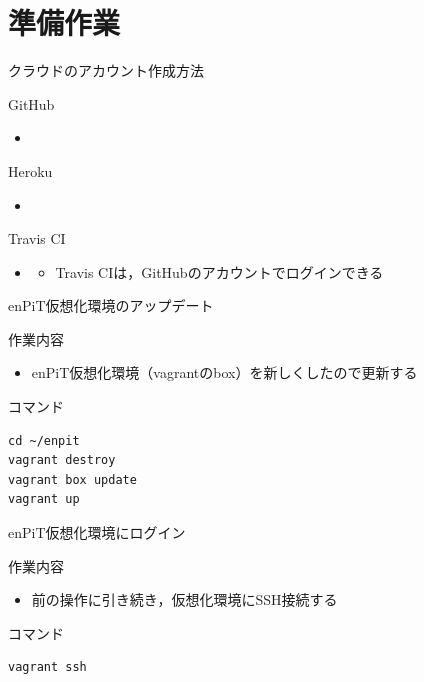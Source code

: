 \documentclass[12pt, t, aspectratio=169]{beamer}
\begin{document}
\section{準備作業}
\label{sec-2-1}
\begin{frame}[label=sec-2-1-1]{クラウドのアカウント作成方法}
\begin{block}{GitHub}
\begin{itemize}
\item{}
\end{itemize}
\end{block}
\begin{block}{Heroku}
\begin{itemize}
\item{}
\end{itemize}
\end{block}
\begin{block}{Travis CI}
\begin{itemize}
\item{}
\begin{itemize}
\item Travis CIは，GitHubのアカウントでログインできる
\end{itemize}
\end{itemize}
\end{block}
\end{frame}
\begin{frame}[fragile,label=sec-2-1-2]{enPiT仮想化環境のアップデート}
 \begin{block}{作業内容}
\begin{itemize}
\item enPiT仮想化環境（vagrantのbox）を新しくしたので更新する
\end{itemize}
\end{block}
\begin{block}{コマンド}
\begin{verbatim}
cd ~/enpit
vagrant destroy
vagrant box update
vagrant up
\end{verbatim}
\end{block}
\end{frame}

\begin{frame}[fragile,label=sec-2-1-3]{enPiT仮想化環境にログイン}
 \begin{block}{作業内容}
\begin{itemize}
\item 前の操作に引き続き，仮想化環境にSSH接続する
\end{itemize}
\end{block}
\begin{block}{コマンド}
\begin{verbatim}
vagrant ssh
\end{verbatim}
\end{block}
\end{frame}
\end{document}
